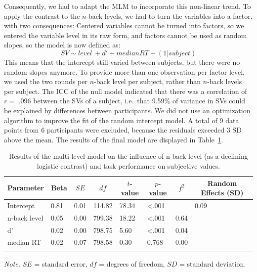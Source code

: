 \documentclass[
  man,floatsintext]{apa6}
\begin{document}
Consequently, we had to adapt the MLM to incorporate this non-linear trend.
To apply the contrast to the \(n\)-back levels, we had to turn the variables into a factor, with two consequences:
Centered variables cannot be turned into factors, so we entered the variable level in its raw form, and factors cannot be used as random slopes, so the model is now defined as:
\[
SV \sim level\ + d' + median RT + (1|subject)
\]
This means that the intercept still varied between subjects, but there were no random slopes anymore.
To provide more than one observation per factor level, we used the two rounds per \(n\)-back level per subject, rather than \(n\)-back levels per subject.
The ICC of the null model indicated that there was a correlation of \(r=\) .096 between the SVs of a subject, i.e.~that 9.59\% of variance in SVs could be explained by differences between participants.
We did not use an optimization algorithm to improve the fit of the random intercept model.
A total of 9 data points from 6 participants were excluded, because the residuals exceeded 3 SD above the mean.
The results of the final model are displayed in Table~\ref{tab:H2b-results}.

\begin{table}[H]

\begin{center}
\begin{threeparttable}

\caption{\label{tab:H2b-results}Results of the multi level model on the influence of n-back level (as a declining logistic contrast) and task performance on subjective values.}

\begin{tabular}{llllllll}
\toprule
Parameter & \multicolumn{1}{c}{Beta} & \multicolumn{1}{c}{$SE$} & \multicolumn{1}{c}{$df$} & \multicolumn{1}{c}{$t$-value} & \multicolumn{1}{c}{$p$-value} & \multicolumn{1}{c}{$f^{2}$} & \multicolumn{1}{c}{Random Effects (SD)}\\
\midrule
Intercept & 0.81 & 0.01 & 114.82 & 78.34 & <.001 &  & 0.09\\
n-back level & 0.05 & 0.00 & 799.38 & 18.22 & <.001 & 0.64 & \\
d' & 0.02 & 0.00 & 798.75 & 5.60 & <.001 & 0.04 & \\
median RT & 0.02 & 0.07 & 798.58 & 0.30 & 0.768 & 0.00 & \\
\bottomrule
\addlinespace
\end{tabular}

\begin{tablenotes}[para]
\normalsize{\textit{Note.} $SE$ = standard error, $df$ = degrees of freedom, $SD$ = standard deviation.}
\end{tablenotes}

\end{threeparttable}
\end{center}

\end{table}
\end{document}
